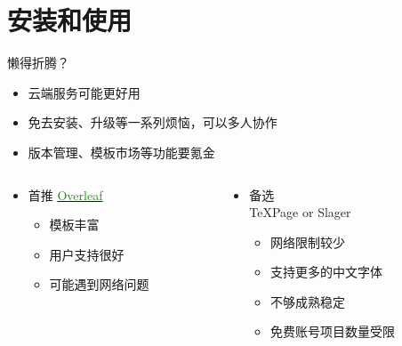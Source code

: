 \section{安装和使用}
\begin{frame}{懒得折腾？}
    \begin{itemize}
        \item 云端服务可能更好用
        \item 免去安装、升级等一系列烦恼，可以多人协作
        \item 版本管理、模板市场等功能要氪金
    \end{itemize}
    \pause
    \begin{columns}
        \begin{column}{0.48\textwidth}
            \begin{itemize}\small
                \item 首推
                      \href{https://www.overleaf.com}{\textcolor[HTML]{138a07}{Overleaf} \faLink}
                      \begin{itemize}
                          \item 模板丰富
                          \item 用户支持很好
                          \item 可能遇到网络问题
                      \end{itemize}
            \end{itemize}
        \end{column}
        \pause
        \begin{column}{0.48\textwidth}
            \begin{itemize}\small
                \item 备选 \\ 
                TeXPage  or Slager 
                      \begin{itemize}
                          \item 网络限制较少
                          \item 支持更多的中文字体
                          \item 不够成熟稳定
                          \item 免费账号项目数量受限
                      \end{itemize}
            \end{itemize}
        \end{column}
    \end{columns}
\end{frame}

